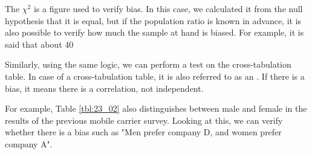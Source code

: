 \documentclass{ltjsbook}
\begin{document}
The $\chi^2$ is a figure used to verify bias. In this case, we calculated it from the null hypothesis that it is equal, but if the population ratio is known in advance, it is also possible to verify how much the sample at hand is biased. For example, it is said that about 40%

Similarly, using the same logic, we can perform a test on the cross-tabulation table. In case of a cross-tabulation table, it is also referred to as an . If there is a bias, it means there is a correlation, not independent.

For example, Table \ref{tbl:23_02} also distinguishes between male and female in the results of the previous mobile carrier survey. Looking at this, we can verify whether there is a bias such as "Men prefer company D, and women prefer company A".
\end{document}
